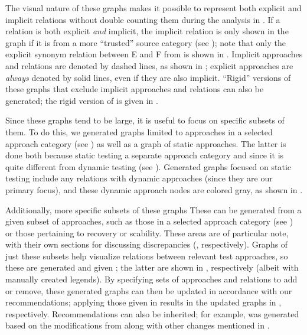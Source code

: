 {        The visual nature of these graphs makes it possible to represent both
        explicit and implicit relations without double counting them during the
        analysis in . If a relation is both explicit
        \emph{and} implicit, the implicit relation is only shown in the graph
        if it is from a more ``trusted'' source category (see );
        note that only the explicit synonym relation between E and F
        from  is shown in .
        Implicit approaches and relations are denoted by dashed lines, as shown
        in ; explicit approaches are
        \emph{always} denoted by solid lines, even if they are also implicit.
        ``Rigid'' versions of these graphs that exclude implicit approaches and
        relations can also be generated; the rigid version of
         is given in .

    \fi
    Since these graphs tend to be large, it is useful to focus on specific
    subsets of them. \ifnotpaper To do this, we generated graphs limited to
        approaches in a selected approach category (see )
        as well as a graph of static approaches. The latter is done both
        because \citet[Fig.~2]{IEEE2022}  static
        testing a separate approach category and since it is quite different
        from dynamic testing (see ). Generated graphs focused
        on static testing include any relations with dynamic approaches (since
        they are our primary focus), and these dynamic approach nodes are
        colored gray, as shown in .

        Additionally, more specific subsets of these graphs \else These \fi
    can be generated from a given subset of approaches, such as
    \ifnotpaper\else those in a selected approach category (see
        ) or \fi those pertaining to recovery or
    scability\ifnotpaper. These areas are of particular note, with their own
    sections for discussing discrepancies (,
    respectively). Graphs of just these subsets help visualize relations
    between relevant test approaches, so these are generated and given
    \else; the latter are shown \fi in , respectively (albeit with manually created
    legends). By specifying sets of approaches and relations to add or remove,
    these generated graphs can then be updated in accordance with our
    recommendations; applying those given in  results in the updated graphs in
    , respectively.
    \ifnotpaper
        Recommendations can also be inherited; for example,
         was generated based on the modifications from
         along with
        other changes mentioned in .
    \fi
}

